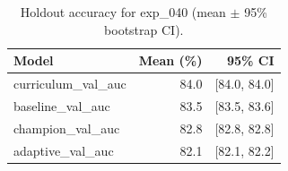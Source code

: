 \begin{table}[ht]
\centering
\caption{Holdout accuracy for exp_040 (mean $\pm$ 95\% bootstrap CI).}
\label{tab:exp_040}
\begin{tabular}{lrr}
\toprule
Model & Mean (\%) & 95\% CI \\
\midrule
curriculum\_val\_auc & 84.0 & [84.0, 84.0] \\
baseline\_val\_auc & 83.5 & [83.5, 83.6] \\
champion\_val\_auc & 82.8 & [82.8, 82.8] \\
adaptive\_val\_auc & 82.1 & [82.1, 82.2] \\
\bottomrule
\end{tabular}
\end{table}
